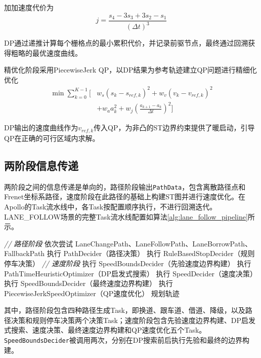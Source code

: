 加加速度代价为
\begin{equation}
j = \frac{s_4 - 3s_3 + 3s_2 - s_1}{(\Delta t)^3}
\end{equation}

DP通过递推计算每个栅格点的最小累积代价，并记录前驱节点，最终通过回溯获得粗略的最优速度曲线。

精优化阶段采用PiecewiseJerk QP，以DP结果为参考轨迹建立QP问题进行精细化优化
\begin{equation}
\begin{aligned}
\min \sum_{k=0}^{K-1} \Big[ &w_s(s_k - s_{ref,k})^2 + w_v(v_k - v_{ref,k})^2 \\
&+ w_a a_k^2 + w_j \left(\frac{a_{k+1} - a_k}{\Delta t}\right)^2 \Big]
\end{aligned}
\label{eq:piecewise_jerk}
\end{equation}

DP输出的速度曲线作为$v_{ref,k}$传入QP，为非凸的ST边界约束提供了暖启动，引导QP在正确的可行区域内求解。

\subsection{两阶段信息传递}

两阶段之间的信息传递是单向的，路径阶段输出\texttt{PathData}，包含离散路径点和Frenet坐标系路径，速度阶段在此路径的基础上构建ST图并进行速度优化。在Apollo的Task流水线中，各Task按配置顺序执行，不进行回溯迭代。LANE\_FOLLOW场景的完整Task流水线配置如算法\ref{alg:lane_follow_pipeline}所示。

\begin{algorithm}[htbp]
\caption{LANE\_FOLLOW场景Task流水线}
\label{alg:lane_follow_pipeline}
\textcolor{gray!30!black}{\textit{// 路径阶段}}\;
依次尝试 LaneChangePath、LaneFollowPath、LaneBorrowPath、FallbackPath \;
执行 PathDecider（路径决策）\;
执行 RuleBasedStopDecider（规则停车决策）\;
\textcolor{gray!30!black}{\textit{// 速度阶段}}\;
执行 SpeedBoundsDecider（先验速度边界构建）\;
执行 PathTimeHeuristicOptimizer（DP启发式搜索）\;
执行 SpeedDecider（速度决策）\;
执行 SpeedBoundsDecider（最终速度边界构建）\;
执行 PiecewiseJerkSpeedOptimizer（QP速度优化）\;
\KwRet 规划轨迹 \;
\end{algorithm}

其中，路径阶段包含四种路径生成Task，即换道、跟车道、借道、降级，以及路径决策和规则停车决策两个决策Task；速度阶段包含先验速度边界构建、DP启发式搜索、速度决策、最终速度边界构建和QP速度优化五个Task。\texttt{SpeedBoundsDecider}被调用两次，分别在DP搜索前后执行先验和最终的边界构建。

